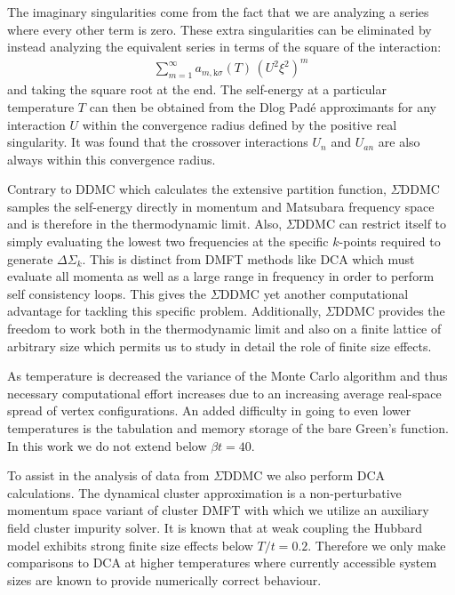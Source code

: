 \documentclass[twocolumn,notitlepage,prl,superscriptaddress,showpacs]{revtex4-1}
\begin{document}
 The imaginary singularities come from the fact that we are analyzing a series where every other term is zero. These extra singularities can be eliminated by instead analyzing the equivalent series in terms of the square of the interaction:
 \begin{align}
     \sum_{m=1}^{\infty} a_{m, \mathrm{k}\sigma}(T) \, \left(U^2 \xi^2 \right)^{m}  
 \end{align}
 and taking the square root at the end. The self-energy at a particular temperature $T$ can then be obtained from the Dlog Pad\'{e} approximants for any interaction $U$ within the convergence radius defined by the positive real singularity. It was found that the  crossover interactions $U_n$ and $U_{an}$ are also always within this convergence radius.

 Contrary to DDMC which calculates the extensive partition function, $\Sigma$DDMC samples the self-energy directly in momentum and Matsubara frequency space and is therefore in the thermodynamic limit. Also, $\Sigma$DDMC can restrict itself to simply evaluating the lowest two frequencies at the specific $k$-points required to generate $\Delta\Sigma_{k}$. This is distinct from DMFT methods like DCA which must evaluate all momenta as well as a large range in frequency in order to perform self consistency loops.\cite{georges:1996} This gives the $\Sigma$DDMC yet another computational advantage for tackling this specific problem.
 Additionally, $\Sigma$DDMC provides the freedom to work both in the thermodynamic limit and also on a finite lattice of arbitrary size which permits us to study in detail the role of finite size effects.
  
As temperature is decreased the variance of the Monte Carlo algorithm and thus necessary computational effort increases due to an increasing average real-space spread of vertex configurations.  An added difficulty in going to even lower temperatures is the tabulation and memory storage of the bare Green's function. In this work we do not extend below $\beta t=40$.

To assist in the analysis of data from $\Sigma$DDMC we also perform DCA calculations.  The dynamical cluster approximation is a non-perturbative momentum space variant of cluster DMFT with which we utilize an auxiliary field cluster impurity solver.\cite{ hettler:2000,jarrell:2001,Maier05} 
 It is known that at weak coupling the Hubbard model exhibits strong finite size effects below $T/t=0.2$.\cite{benchmark:2015}  Therefore we only make comparisons to DCA at higher temperatures where currently accessible system sizes are known to provide numerically correct behaviour. \cite{benchmark:2015}
\end{document}
